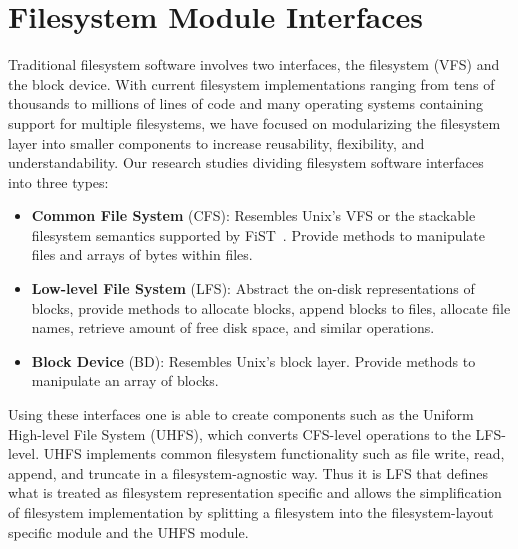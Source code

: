 \section{Filesystem Module Interfaces}
\label{sec:interfaces}

Traditional filesystem software involves two interfaces, the
filesystem (VFS) and the block device. With current filesystem
implementations ranging from tens of thousands to millions of lines of
code and many operating systems containing support for multiple
filesystems, we have focused on modularizing the filesystem layer into
smaller components to increase reusability, flexibility, and
understandability. Our research studies dividing filesystem software
interfaces into three types:

\begin{itemize}
\item \itemvspace{} {\bf Common File System} (CFS): Resembles Unix's
  VFS or the stackable filesystem semantics supported by
  FiST~\cite{zadok00fist}. Provide methods to manipulate files and
  arrays of bytes within files.
\item \itemvspace{} {\bf Low-level File System} (LFS): Abstract the
  on-disk representations of blocks, provide methods to allocate
  blocks, append blocks to files, allocate file names, retrieve amount
  of free disk space, and similar operations.
\item \itemvspace{} {\bf Block Device} (BD): Resembles Unix's block
  layer. Provide methods to manipulate an array of blocks.
\end{itemize}
\postlistspacing{}

Using these interfaces one is able to create components such as the
Uniform High-level File System (UHFS), which converts CFS-level
operations to the LFS-level. UHFS implements common filesystem
functionality such as file write, read, append, and truncate in a
filesystem-agnostic way. Thus it is LFS that defines what is treated
as filesystem representation specific and allows the simplification of
filesystem implementation by splitting a filesystem into the
filesystem-layout specific module and the UHFS module.
